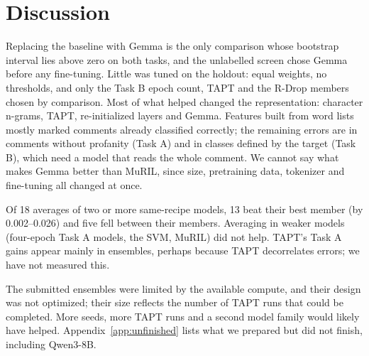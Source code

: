 \documentclass[11pt]{article}
\newcommand{\taska}{Task A}
\newcommand{\taskb}{Task B}
\begin{document}
\section{Discussion}
Replacing the baseline with Gemma is the only comparison whose bootstrap interval
lies above zero on both tasks, and the unlabelled screen chose Gemma before any
fine-tuning. Little was tuned on the holdout: equal weights, no thresholds, and
only the \taskb{} epoch count, TAPT and the R-Drop members chosen by comparison.
Most of what helped changed the representation: character n-grams, TAPT,
re-initialized layers and Gemma. Features built from word lists mostly marked
comments already classified correctly; the remaining errors are in comments
without profanity (\taska{}) and in classes defined by the target (\taskb{}),
which need a model that reads the whole comment. We cannot say what makes Gemma
better than MuRIL, since size, pretraining data, tokenizer and fine-tuning all
changed at once.

Of 18 averages of two or more same-recipe models, 13 beat their best member (by
0.002--0.026) and five fell between their members. Averaging in weaker models
(four-epoch \taska{} models, the SVM, MuRIL) did not help. TAPT's \taska{} gains
appear mainly in ensembles, perhaps because TAPT decorrelates errors; we have not
measured this.

The submitted ensembles were limited by the available compute, and their design
was not optimized; their size reflects the number of TAPT runs that could be completed. More seeds, more TAPT runs and
a second model family would likely have helped. Appendix~\ref{app:unfinished}
lists what we prepared but did not finish, including Qwen3-8B.
\end{document}
